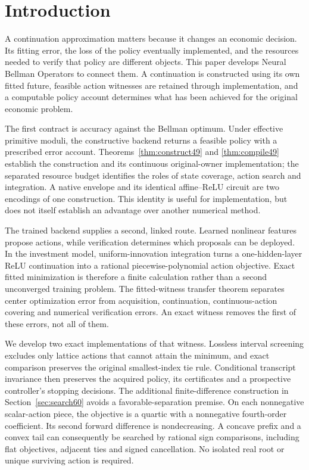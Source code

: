 \section{Introduction}\label{sec:introduction56}
A continuation approximation matters because it changes an economic decision. Its fitting error, the loss of the policy eventually implemented, and the resources needed to verify that policy are different objects. This paper develops Neural Bellman Operators to connect them. A continuation is constructed using its own fitted future, feasible action witnesses are retained through implementation, and a computable policy account determines what has been achieved for the original economic problem.

The first contract is accuracy against the Bellman optimum. Under effective primitive moduli, the constructive backend returns a feasible policy with a prescribed error account. Theorems~\ref{thm:construct49} and \ref{thm:compile49} establish the construction and its continuous original-owner implementation; the separated resource budget identifies the roles of state coverage, action search and integration. A native envelope and its identical affine--ReLU circuit are two encodings of one construction. This identity is useful for implementation, but does not itself establish an advantage over another numerical method.

The trained backend supplies a second, linked route. Learned nonlinear features propose actions, while verification determines which proposals can be deployed. In the investment model, uniform-innovation integration turns a one-hidden-layer ReLU continuation into a rational piecewise-polynomial action objective. Exact fitted minimization is therefore a finite calculation rather than a second unconverged training problem. The fitted-witness transfer theorem separates center optimization error from acquisition, continuation, continuous-action covering and numerical verification errors. An exact witness removes the first of these errors, not all of them.

We develop two exact implementations of that witness. Lossless interval screening excludes only lattice actions that cannot attain the minimum, and exact comparison preserves the original smallest-index tie rule. Conditional transcript invariance then preserves the acquired policy, its certificates and a prospective controller's stopping decisions. The additional finite-difference construction in Section~\ref{sec:search60} avoids a favorable-separation premise. On each nonnegative scalar-action piece, the objective is a quartic with a nonnegative fourth-order coefficient. Its second forward difference is nondecreasing. A concave prefix and a convex tail can consequently be searched by rational sign comparisons, including flat objectives, adjacent ties and signed cancellation. No isolated real root or unique surviving action is required.

